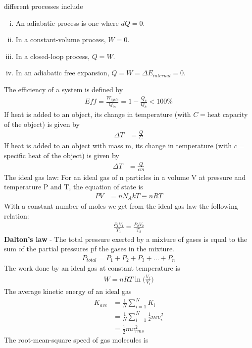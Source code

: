 \begin{multicols}{2}
different processes include
\begin{enumerate}[(i)]
	\item An adiabatic process is one where $dQ=0$.
	\item In a constant-volume process, $W=0$.
	\item In a closed-loop process, $Q=W$.
	\item In an adiabatic free expansion, $Q=W=\Delta E_{internal}=0$.
\end{enumerate}
The efficiency of a system is defined by
\begin{align}
Eff = \frac{W_{cycle}}{Q_{in}}=1-\frac{Q_c}{Q_h}<100\%
\end{align}
If heat is added to an object, its change in temperature (with $C=$heat capacity of the object) is given by 
\begin{align}
\Delta T &= \frac{Q}{C}
\end{align}
If heat is added to an object with mass m, its change in temperature (with $c=$specific heat of the object) is given by 
\begin{align}
\Delta T &= \frac{Q}{cm}
\end{align}
The ideal gas law: For an ideal gas of n particles in a volume V at pressure and temperature P and T, the equation of state is
\begin{align}
PV &=nN_AkT\equiv nRT
\end{align}
With a constant number of moles we get from the ideal gas law the following relation:
\begin{align}
\frac{P_1V_1}{T_1}=\frac{P_2V_2}{T_2}
\end{align}
\textbf{Dalton's law} - The total pressure exerted by a mixture of gases is equal to the sum of the partial pressures pf the gases in the mixture.
\begin{align}
P_{total}=P_1+P_2+P_3+\dots + P_n
\end{align}
The work done by an ideal gas at constant temperature is
\begin{align}
W=nRT\ln\bigg(\frac{V_f}{V_i}\bigg)
\end{align}
The average kinetic energy of an ideal gas
\begin{align}
K_{ave} &=\frac{1}{N}\sum_{i=1}^{N}K_i\\&=\frac{1}{N}\sum_{i=1}^{N}\frac{1}{2}mv_i^2\\&= \frac{1}{2}mv_{rms}^2
\end{align}
The root-mean-square speed of gas molecules is

\end{multicols}

